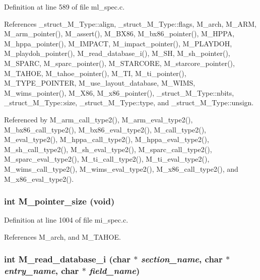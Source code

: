 Definition at line 589 of file ml\_\-spec.c.

References \_\-struct\_\-M\_\-Type::align, \_\-struct\_\-M\_\-Type::flags, M\_\-arch, M\_\-ARM, M\_\-arm\_\-pointer(), M\_\-assert(), M\_\-BX86, M\_\-bx86\_\-pointer(), M\_\-HPPA, M\_\-hppa\_\-pointer(), M\_\-IMPACT, M\_\-impact\_\-pointer(), M\_\-PLAYDOH, M\_\-playdoh\_\-pointer(), M\_\-read\_\-database\_\-i(), M\_\-SH, M\_\-sh\_\-pointer(), M\_\-SPARC, M\_\-sparc\_\-pointer(), M\_\-STARCORE, M\_\-starcore\_\-pointer(), M\_\-TAHOE, M\_\-tahoe\_\-pointer(), M\_\-TI, M\_\-ti\_\-pointer(), M\_\-TYPE\_\-POINTER, M\_\-use\_\-layout\_\-database, M\_\-WIMS, M\_\-wims\_\-pointer(), M\_\-X86, M\_\-x86\_\-pointer(), \_\-struct\_\-M\_\-Type::nbits, \_\-struct\_\-M\_\-Type::size, \_\-struct\_\-M\_\-Type::type, and \_\-struct\_\-M\_\-Type::unsign.

Referenced by M\_\-arm\_\-call\_\-type2(), M\_\-arm\_\-eval\_\-type2(), M\_\-bx86\_\-call\_\-type2(), M\_\-bx86\_\-eval\_\-type2(), M\_\-call\_\-type2(), M\_\-eval\_\-type2(), M\_\-hppa\_\-call\_\-type2(), M\_\-hppa\_\-eval\_\-type2(), M\_\-sh\_\-call\_\-type2(), M\_\-sh\_\-eval\_\-type2(), M\_\-sparc\_\-call\_\-type2(), M\_\-sparc\_\-eval\_\-type2(), M\_\-ti\_\-call\_\-type2(), M\_\-ti\_\-eval\_\-type2(), M\_\-wims\_\-call\_\-type2(), M\_\-wims\_\-eval\_\-type2(), M\_\-x86\_\-call\_\-type2(), and M\_\-x86\_\-eval\_\-type2().
\subsubsection{\setlength{\rightskip}{0pt plus 5cm}int M\_\-pointer\_\-size (void)}\label{m__spec_8h_e793cc6538b793b34c086eac0f1fde67}




Definition at line 1004 of file mi\_\-spec.c.

References M\_\-arch, and M\_\-TAHOE.
\subsubsection{\setlength{\rightskip}{0pt plus 5cm}int M\_\-read\_\-database\_\-i (char $\ast$ {\em section\_\-name}, char $\ast$ {\em entry\_\-name}, char $\ast$ {\em field\_\-name})}\label{m__spec_8h_8a1091596631acc53c7e9cd5deb2c090}




